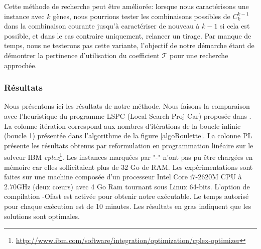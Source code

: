 \begin{remarque}
Cette méthode de recherche peut être améliorée: lorsque nous caractérisons une instance avec $k$ gènes, nous pourrions tester les combinaisons possibles de $C_k^{k-1}$ dans la combinaison courante jusqu'à caractériser de nouveau à $k-1$ si cela est possible, et dans le cas contraire uniquement, relancer un tirage. Par manque de temps, nous ne testerons pas cette variante, l'objectif de notre démarche étant de démontrer la pertinence d'utilisation du coefficient $\mathcal{T}$ pour une recherche approchée.
\end{remarque}

\subsubsection{Résultats}
Nous présentons ici les résultats de notre méthode. Nous faisons la comparaison avec l'heuristique du programme LSPC (Local Search Proj Car) proposée dans \cite{Chhel2013}. La colonne itération correspond aux nombres d'itérations de la boucle infinie (boucle 1) présentée dans l'algorithme de la figure \ref{algoRoulette}.
La colonne PL présente les résultats obtenus par reformulation en programmation linéaire sur le solveur IBM \textit{cplex}\footnote{\url{http://www.ibm.com/software/integration/optimization/cplex-optimizer}}. Les instances marquées par "-" n'ont pas pu être chargées en mémoire car elles sollicitaient plus de 32 Go de RAM. Les expérimentations sont faites sur une machine composée d'un processeur Intel Core i7-2620M CPU à 2.70GHz (deux cœurs) avec 4 Go Ram tournant sous Linux 64-bits. L'option de compilation -Ofast est activée pour obtenir notre exécutable. Le temps autorisé pour chaque exécution est de 10 minutes. Les résultats en gras indiquent que les solutions sont optimales.


